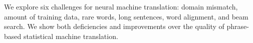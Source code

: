 We explore six challenges for neural machine translation: domain mismatch, amount of training data, rare words, long sentences, word alignment, and beam search. We show both deficiencies and improvements over the quality of phrase-based statistical machine translation.
